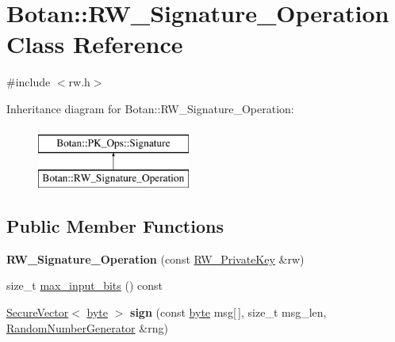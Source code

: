\hypertarget{classBotan_1_1RW__Signature__Operation}{\section{Botan\-:\-:R\-W\-\_\-\-Signature\-\_\-\-Operation Class Reference}
\label{classBotan_1_1RW__Signature__Operation}
}


{\ttfamily \#include $<$rw.\-h$>$}

Inheritance diagram for Botan\-:\-:R\-W\-\_\-\-Signature\-\_\-\-Operation\-:\begin{figure}[H]
\begin{center}
\leavevmode
\includegraphics[height=2.000000cm]{classBotan_1_1RW__Signature__Operation}
\end{center}
\end{figure}
\subsection*{Public Member Functions}
\begin{DoxyCompactItemize}
\item 
\hypertarget{classBotan_1_1RW__Signature__Operation_a60aa581bd6506baf42f838fc26553880}{{\bfseries R\-W\-\_\-\-Signature\-\_\-\-Operation} (const \hyperlink{classBotan_1_1RW__PrivateKey}{R\-W\-\_\-\-Private\-Key} \&rw)}\label{classBotan_1_1RW__Signature__Operation_a60aa581bd6506baf42f838fc26553880}

\item 
size\-\_\-t \hyperlink{classBotan_1_1RW__Signature__Operation_a827104fbfb05b97e0b3dcb403380c99b}{max\-\_\-input\-\_\-bits} () const 
\item 
\hypertarget{classBotan_1_1RW__Signature__Operation_acfcdfc628e4c8a556c52348cd26c49c3}{\hyperlink{classBotan_1_1SecureVector}{Secure\-Vector}$<$ \hyperlink{namespaceBotan_a7d793989d801281df48c6b19616b8b84}{byte} $>$ {\bfseries sign} (const \hyperlink{namespaceBotan_a7d793989d801281df48c6b19616b8b84}{byte} msg\mbox{[}$\,$\mbox{]}, size\-\_\-t msg\-\_\-len, \hyperlink{classBotan_1_1RandomNumberGenerator}{Random\-Number\-Generator} \&rng)}\label{classBotan_1_1RW__Signature__Operation_acfcdfc628e4c8a556c52348cd26c49c3}

\end{DoxyCompactItemize}


